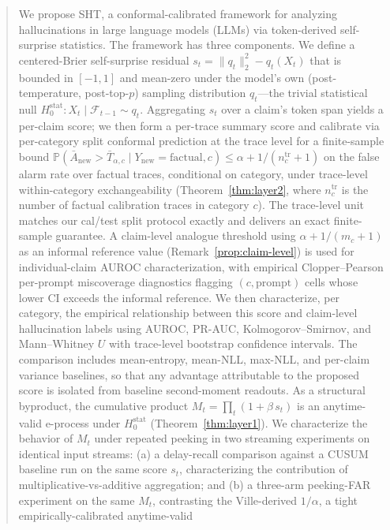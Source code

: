 \documentclass[runningheads]{llncs}
\newcommand{\Hnull}{H_0^{\text{stat}}}
\begin{document}
\begin{abstract}
We propose SHT, a conformal-calibrated framework for analyzing
hallucinations in large language models (LLMs) via token-derived
self-surprise statistics. The framework has three components.
We define a centered-Brier self-surprise residual
$s_t = \|q_t\|_2^2 - q_t(X_t)$ that is bounded in $[-1, 1]$ and
mean-zero under the model's own (post-temperature, post-top-$p$)
sampling distribution $q_t$---the trivial statistical null
$\Hnull: X_t \mid \mathcal{F}_{t-1} \sim q_t$. Aggregating $s_t$ over
a claim's token span yields a per-claim score; we then form a per-trace
summary score and calibrate via per-category split conformal prediction at
the trace level for a finite-sample bound
$\mathbb{P}(\bar{A}_{\text{new}} > \bar{T}_{\alpha,c} \mid Y_{\text{new}} =
\text{factual}, c) \le \alpha + 1/(n_c^{\text{tr}}+1)$ on the false alarm
rate over factual traces, conditional on category, under trace-level
within-category exchangeability (Theorem~\ref{thm:layer2}, where
$n_c^{\text{tr}}$ is the number of factual calibration traces in category
$c$). The trace-level unit matches our cal/test split protocol exactly
and delivers an exact finite-sample guarantee. A claim-level analogue
threshold using $\alpha + 1/(m_c+1)$ as an informal reference value
(Remark~\ref{prop:claim-level}) is used for individual-claim AUROC
characterization, with empirical Clopper--Pearson per-prompt miscoverage
diagnostics flagging $(c, \text{prompt})$ cells whose lower CI exceeds
the informal reference. We then characterize, per
category, the empirical relationship between this score and
claim-level hallucination labels using AUROC, PR-AUC,
Kolmogorov--Smirnov, and Mann--Whitney $U$ with trace-level bootstrap
confidence intervals. The comparison includes mean-entropy, mean-NLL,
max-NLL, and per-claim variance baselines, so that any advantage
attributable to the proposed score is isolated from baseline
second-moment readouts. As a structural byproduct, the cumulative
product $M_t = \prod_t(1 + \beta\, s_t)$ is an anytime-valid e-process
under $\Hnull$ (Theorem~\ref{thm:layer1}). We characterize the
behavior of $M_t$ under repeated peeking in two streaming experiments
on identical input streams: (a) a delay-recall comparison against a
CUSUM baseline run on the same score $s_t$, characterizing the
contribution of multiplicative-vs-additive aggregation; and (b) a
three-arm peeking-FAR experiment on the same $M_t$, contrasting the
Ville-derived $1/\alpha$, a tight empirically-calibrated anytime-valid

\end{abstract}
\end{document}
